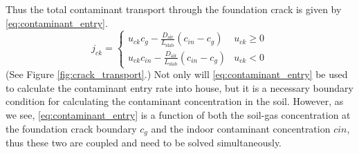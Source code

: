 Thus the total contaminant transport through the foundation crack is given by \eqref{eq:contaminant_entry}.
\begin{equation}\label{eq:contaminant_entry}
  j_{ck} = \begin{cases}
    u_{ck} c_g - \frac{D_\mathrm{air}}{L_\mathrm{slab}} (c_{in} - c_g) & u_{ck} \geq 0 \\
    u_{ck} c_{in} - \frac{D_\mathrm{air}}{L_\mathrm{slab}} (c_{in} - c_g) & u_{ck} < 0
\end{cases}
\end{equation}
(See Figure \ref{fig:crack_transport}.)
Not only will \eqref{eq:contaminant_entry} be used to calculate the contaminant entry rate into house, but it is a necessary boundary condition for calculating the contaminant concentration in the soil.
However, as we see, \eqref{eq:contaminant_entry} is a function of both the soil-gas concentration at the foundation crack boundary $c_g$ and the indoor contaminant concentration $c{in}$, thus these two are coupled and need to be solved simultaneously.\par
